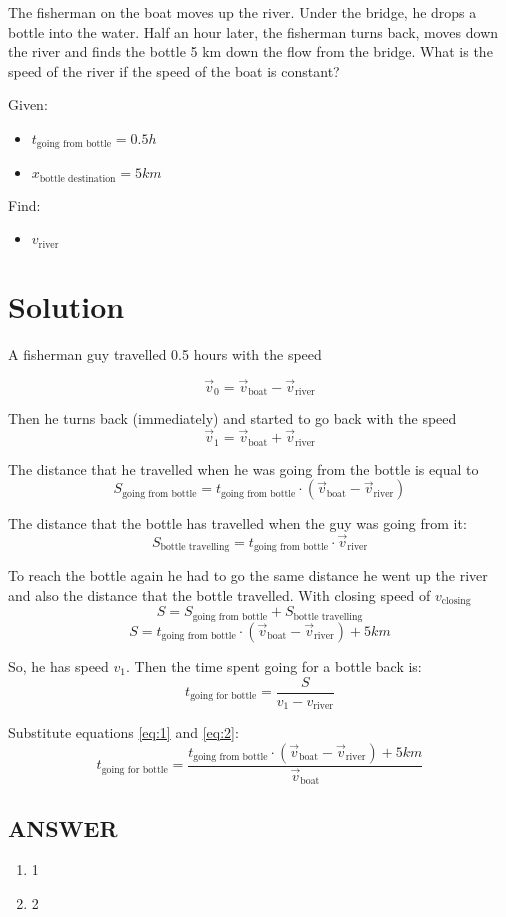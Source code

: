 The fisherman on the boat moves up the river. Under the bridge, he drops a bottle into the water.
Half an hour later, the fisherman turns back, moves down the river and finds the bottle 5 km
down the flow from the bridge. What is the speed of the river if the speed of the boat is constant?

\bigbreak Given: \begin{itemize}
    \item $t_{\text{going from bottle}} = 0.5h$
    \item $x_{\text{bottle destination}} = 5km$
\end{itemize}

Find: \begin{itemize}
    \item $v_{\text{river}}$
\end{itemize}

\section*{Solution}

A fisherman guy travelled 0.5 hours with the speed

$$\Vec{v}_0 = \Vec{v}_{\text{boat}} - \Vec{v}_{\text{river}}$$

Then he turns back (immediately) and started to go back with the speed
\begin{equation}
    \label{eq:1}
    \Vec{v}_1 = \Vec{v}_{\text{boat}} + \Vec{v}_{\text{river}}
\end{equation}

The distance that he travelled when he was going from the bottle is equal to
$$S_{\text{going from bottle}} = t_{\text{going from bottle}} \cdot (\Vec{v}_{\text{boat}} - \Vec{v}_{\text{river}})$$

The distance that the bottle has travelled when the guy was going from it:
$$S_{\text{bottle travelling}} = t_{\text{going from bottle}} \cdot \Vec{v}_{\text{river}}$$

To reach the bottle again he had to go the same distance he went up the river and also the distance that the bottle travelled.
With closing speed of $v_\text{closing}$
$$S = S_{\text{going from bottle}} + S_{\text{bottle travelling}}$$
\begin{equation}
    \label{eq:2}
    S = t_{\text{going from bottle}} \cdot (\Vec{v}_{\text{boat}} - \Vec{v}_{\text{river}}) + 5km
\end{equation}

So, he has speed $v_1$. Then the time spent going for a bottle back is:
$$t_{\text{going for bottle}} = \frac{S}{v_1 - v_{\text{river}}}$$

Substitute equations \eqref{eq:1} and \eqref{eq:2}:
$$t_{\text{going for bottle}} = \frac{t_{\text{going from bottle}} \cdot (\Vec{v}_{\text{boat}} - \Vec{v}_{\text{river}}) + 5km}{\Vec{v}_{\text{boat}}}$$


\vfill
\subsection*{ANSWER}
\begin{enumerate}
    \item 1
    \item 2
\end{enumerate}

